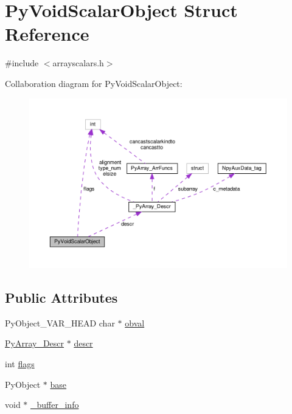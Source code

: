 \hypertarget{structPyVoidScalarObject}{}\section{Py\+Void\+Scalar\+Object Struct Reference}
\label{structPyVoidScalarObject}


{\ttfamily \#include $<$arrayscalars.\+h$>$}



Collaboration diagram for Py\+Void\+Scalar\+Object\+:
\nopagebreak
\begin{figure}[H]
\begin{center}
\leavevmode
\includegraphics[width=350pt]{structPyVoidScalarObject__coll__graph}
\end{center}
\end{figure}
\subsection*{Public Attributes}
\begin{DoxyCompactItemize}
\item 
Py\+Object\+\_\+\+V\+A\+R\+\_\+\+H\+E\+AD char $\ast$ \hyperlink{structPyVoidScalarObject_af7db74c44246f091c473bf87de502622}{obval}
\item 
\hyperlink{ndarraytypes_8h_a08fb2fb967ebbdd179e08d7b8756bd75}{Py\+Array\+\_\+\+Descr} $\ast$ \hyperlink{structPyVoidScalarObject_adcb0a313704a27f06142e94a80dbc6ef}{descr}
\item 
int \hyperlink{structPyVoidScalarObject_a0dafb5132b2d92c88b2d17eb9b390a16}{flags}
\item 
Py\+Object $\ast$ \hyperlink{structPyVoidScalarObject_a998543bf14e835300105d6e3155dbc56}{base}
\item 
void $\ast$ \hyperlink{structPyVoidScalarObject_a9415ad09d4bdc2b8373aebb27fd096cb}{\+\_\+buffer\+\_\+info}
\end{DoxyCompactItemize}


